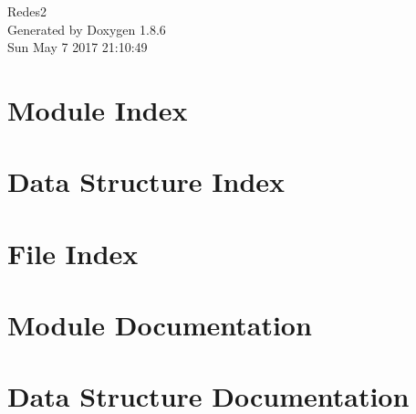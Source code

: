 \documentclass[twoside]{book}
\newcommand{\clearemptydoublepage}{%
  \newpage{\pagestyle{empty}\cleardoublepage}%
}
\begin{document}
\hypersetup{pageanchor=false}
\begin{titlepage}
\vspace*{7cm}
\begin{center}%
{\Large Redes2 }\\
\vspace*{1cm}
{\large Generated by Doxygen 1.8.6}\\
\vspace*{0.5cm}
{\small Sun May 7 2017 21:10:49}\\
\end{center}
\end{titlepage}
\clearemptydoublepage
\tableofcontents
\clearemptydoublepage
{}
\hypersetup{pageanchor=true}

\chapter{Module Index}

\chapter{Data Structure Index}

\chapter{File Index}

\chapter{Module Documentation}














\chapter{Data Structure Documentation}




\end{document}
